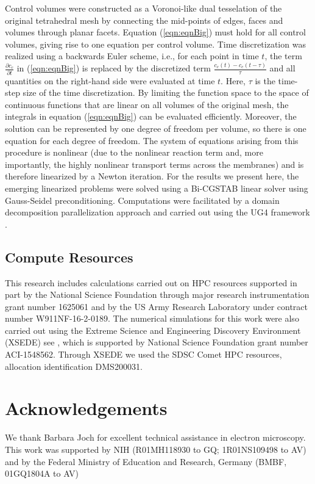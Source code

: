 \documentclass[12pt]{article}
\begin{document}
Control volumes were constructed as a Voronoi-like dual tesselation of the original tetrahedral mesh by connecting the mid-points of edges, faces and volumes through planar facets. Equation (\ref{eqn:eqnBig}) must hold for all control volumes, giving rise to one equation per control volume. Time discretization was realized using a backwards Euler scheme, i.e., for each point in time $t$, the term $\frac{\partial c_c}{\partial t}$ in (\ref{eqn:eqnBig}) is replaced by the discretized term $\frac{c_c(t)-c_c(t-\tau)}{\tau}$ and all quantities on the right-hand side were evaluated at time $t$. Here, $\tau$ is the time-step size of the time discretization. By limiting the function space to the space of continuous functions that are linear on all volumes of the original mesh, the integrals in equation (\ref{eqn:eqnBig}) can be evaluated efficiently. Moreover, the solution can be represented by one degree of freedom per volume, so there is one equation for each degree of freedom. The system of equations arising from this procedure is nonlinear (due to the nonlinear reaction term and, more importantly, the highly nonlinear transport terms across the membranes) and is therefore linearized by a Newton iteration.
For the results we present here, the emerging linearized problems were solved using a Bi-CGSTAB \cite{vanderVorst1992} linear solver using Gauss-Seidel preconditioning. Computations were facilitated by a domain decomposition parallelization approach and carried out using the UG4 framework \cite{Vogel2013}. 
\subsection*{Compute Resources}
This research includes calculations carried out on HPC resources supported in part by the National Science Foundation through major research instrumentation grant number 1625061 and by the US Army Research Laboratory under contract number W911NF-16-2-0189. The numerical simulations for this work were also carried out using the Extreme Science and Engineering Discovery Environment (XSEDE) see \cite{Towns2014}, which is supported by National Science Foundation grant number ACI-1548562. Through XSEDE we used the SDSC Comet HPC resources, allocation identification DMS200031. 

\section*{Acknowledgements} We thank Barbara Joch for excellent technical assistance in electron microscopy. This work was supported by NIH (R01MH118930 to GQ; 1R01NS109498 to AV) and by the Federal Ministry of Education and Research, Germany (BMBF, 01GQ1804A to AV)
\end{document}
